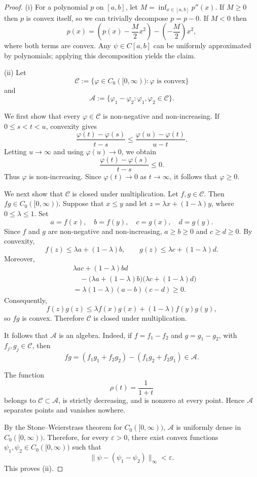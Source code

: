 \documentclass{amsart}
\theoremstyle{definition}
\theoremstyle{remark}
\numberwithin{equation}{section}
\begin{document}
\begin{proof}
(i) For a polynomial $p$ on $[a,b]$, let $M = \inf_{x\in[a,b]} p''(x)$. If $M\geq 0$ then $p$ is convex itself, so we can trivially decompose $p=p-0$. If $M<0$ then 
\[
    p(x) = (p(x)-\frac{M}{2}x^2) - (-\frac{M}{2})x^2,
\]
where both terms are convex. Any $\psi\in C[a,b]$ can be uniformly approximated by polynomials; applying this decomposition yields the claim.

(ii) Let
\[
\mathcal C
:=
\{\varphi\in C_0([0,\infty)):
\varphi\text{ is convex}\}
\]
and
\[
\mathcal A
:=
\{\varphi_1-\varphi_2:
\varphi_1,\varphi_2\in\mathcal C\}.
\]

We first show that every $\varphi\in\mathcal C$ is non-negative and
non-increasing. If $0\leq s<t<u$, convexity gives
\[
\frac{\varphi(t)-\varphi(s)}{t-s}
\leq
\frac{\varphi(u)-\varphi(t)}{u-t}.
\]
Letting $u\to\infty$ and using $\varphi(u)\to 0$, we obtain
\[
\frac{\varphi(t)-\varphi(s)}{t-s}\leq 0.
\]
Thus $\varphi$ is non-increasing. Since $\varphi(t)\to 0$ as
$t\to\infty$, it follows that $\varphi\geq 0$.

We next show that $\mathcal C$ is closed under multiplication. Let
$f,g\in\mathcal C$. Then $fg\in C_0([0,\infty))$. Suppose that
$x\leq y$ and let $z=\lambda x+(1-\lambda)y$, where
$0\leq\lambda\leq 1$. Set
\[
a=f(x),\quad b=f(y),\quad c=g(x),\quad d=g(y).
\]
Since $f$ and $g$ are non-negative and non-increasing,
$a\geq b\geq 0$ and $c\geq d\geq 0$. By convexity,
\[
f(z)\leq \lambda a+(1-\lambda)b,
\qquad
g(z)\leq \lambda c+(1-\lambda)d.
\]
Moreover,
\[
\begin{aligned}
&\lambda ac+(1-\lambda)bd
\\
&\quad-
\bigl(\lambda a+(1-\lambda)b\bigr)
\bigl(\lambda c+(1-\lambda)d\bigr)
\\
&=
\lambda(1-\lambda)(a-b)(c-d)\geq 0.
\end{aligned}
\]
Consequently,
\[
f(z)g(z)
\leq
\lambda f(x)g(x)+(1-\lambda)f(y)g(y),
\]
so $fg$ is convex. Therefore $\mathcal C$ is closed under
multiplication.

It follows that $\mathcal A$ is an algebra. Indeed, if
$f=f_1-f_2$ and $g=g_1-g_2$, with $f_j,g_j\in\mathcal C$, then
\[
fg
=
(f_1g_1+f_2g_2)-(f_1g_2+f_2g_1)\in\mathcal A.
\]

The function
\[
\rho(t)=\frac{1}{1+t}
\]
belongs to $\mathcal C\subset\mathcal A$, is strictly decreasing, and
is nonzero at every point. Hence $\mathcal A$ separates points and
vanishes nowhere.

By the Stone--Weierstrass theorem for $C_0([0,\infty))$, $\mathcal A$
is uniformly dense in $C_0([0,\infty))$. Therefore, for every
$\varepsilon>0$, there exist convex functions
$\psi_1,\psi_2\in C_0([0,\infty))$ such that
\[
\|\psi-(\psi_1-\psi_2)\|_\infty<\varepsilon.
\]
This proves (ii).
\end{proof}
\end{document}
